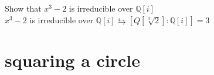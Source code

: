 \documentclass{article}
\begin{document}
Show that $x^3 - 2$ is irreducible over $\mathbb{Q}[i]$ \\
$x^3 - 2$ is irreducible over $\mathbb{Q}[i] \leftrightarrows  [Q[\sqrt[3]{2}] : \mathbb{Q} [i]] = 3$ 


\section{squaring a circle}
\end{document}
